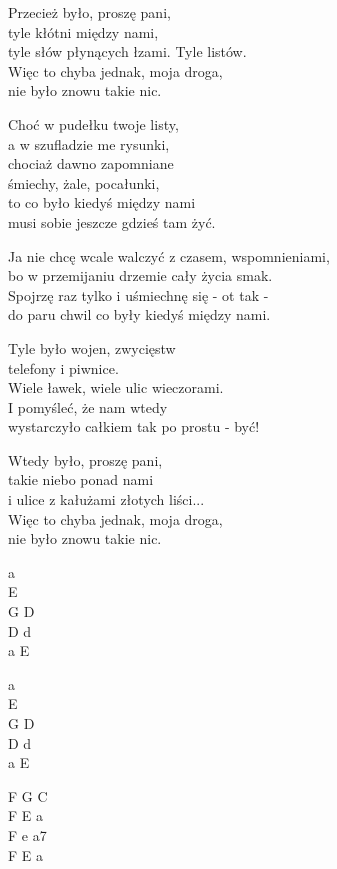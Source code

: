 \begin{text}
    Przecież było, proszę pani,\\
    tyle kłótni między nami,\\
    tyle słów płynących łzami. Tyle listów.\\
    Więc to chyba jednak, moja droga,\\
    nie było znowu takie nic.

    Choć w pudełku twoje listy,\\
    a w szufladzie me rysunki,\\
    chociaż dawno zapomniane\\
    śmiechy, żale, pocałunki,\\
    to co było kiedyś między nami\\
    musi sobie jeszcze gdzieś tam żyć.

    Ja nie chcę wcale walczyć z czasem, wspomnieniami,\\
    bo w przemijaniu drzemie cały życia smak.\\
    Spojrzę raz tylko i uśmiechnę się - ot tak -\\
    do paru chwil co były kiedyś między nami.

    Tyle było wojen, zwycięstw\\
    telefony i piwnice.\\
    Wiele ławek, wiele ulic wieczorami.\\
    I pomyśleć, że nam wtedy\\
    wystarczyło całkiem tak po prostu - być!

    Wtedy było, proszę pani,\\
    takie niebo ponad nami\\
    i ulice z kałużami złotych liści...\\
    Więc to chyba jednak, moja droga,\\
    nie było znowu takie nic.
\end{text}
\begin{chord}
    a\\
    E\\
    G D\\
    D d\\
    a E

    a\\
    E\\
    G D\\
    D d\\
    a E

    F G C\\
    F E a\\
    F e a7\\
    F E a
\end{chord}